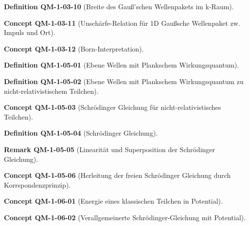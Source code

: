 \documentclass[10pt, letterpaper]{article}
\newcommand{\CustomHeading}[3]{%
  \par\medskip\noindent%
  \textbf{#1 #2} \textnormal{(#3)}.\enskip%
}
\newenvironment{DEF}[2]{\CustomHeading{Definition}{#1}{#2}}{}
\newenvironment{REM}[2]{\CustomHeading{Remark}{#1}{#2}}{}
\newenvironment{CONC}[2]{\CustomHeading{Concept}{#1}{#2}}{}
\begin{document}
\begin{DEF}{QM-1-03-10}{Breite des Gauß'schen Wellenpakets im k-Raum}
\end{DEF}

\begin{CONC}{QM-1-03-11}{Unschärfe-Relation für 1D Gaußsche Wellenpaket zw. Impuls und Ort}
\end{CONC}

\begin{CONC}{QM-1-03-12}{Born-Interpretation}
\end{CONC}

\begin{DEF}{QM-1-05-01}{Ebene Wellen mit Plankschem Wirkungsquantum}
\end{DEF}

\begin{DEF}{QM-1-05-02}{Ebene Wellen mit Plankschem Wirkungsquantum zu nicht-relativistischem Teilchen}
\end{DEF}

\begin{CONC}{QM-1-05-03}{Schrödinger Gleichung für nicht-relativistisches Teilchen}
\end{CONC}

\begin{DEF}{QM-1-05-04}{Schrödinger Gleichung}
\end{DEF}

\begin{REM}{QM-1-05-05}{Linearität und Superposition der Schrödinger Gleichung}
\end{REM}

\begin{CONC}{QM-1-05-06}{Herleitung der freien Schrödinger Gleichung durch Korrspondenzprinzip}
\end{CONC}

\begin{CONC}{QM-1-06-01}{Energie eines klassischen Teilchen in Potential}
\end{CONC}

\begin{CONC}{QM-1-06-02}{Verallgemeinerte Schrödinger-Gleichung mit Potential}
\end{CONC}
\end{document}
